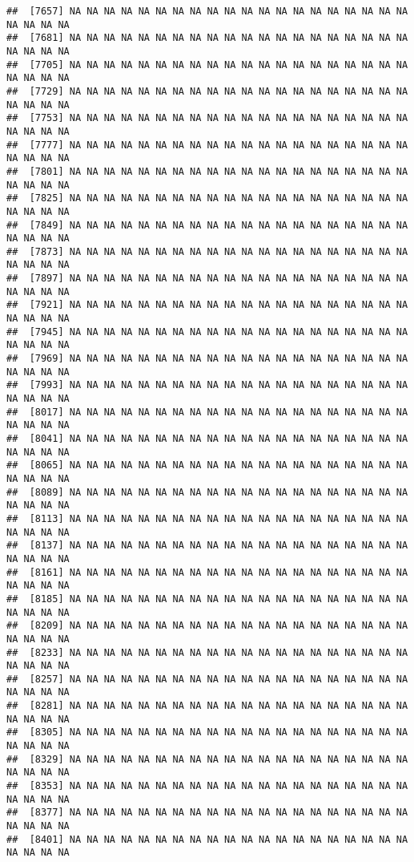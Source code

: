 \documentclass[
]{article}
\begin{document}
\begin{verbatim}
##  [7657] NA NA NA NA NA NA NA NA NA NA NA NA NA NA NA NA NA NA NA NA NA NA NA NA
##  [7681] NA NA NA NA NA NA NA NA NA NA NA NA NA NA NA NA NA NA NA NA NA NA NA NA
##  [7705] NA NA NA NA NA NA NA NA NA NA NA NA NA NA NA NA NA NA NA NA NA NA NA NA
##  [7729] NA NA NA NA NA NA NA NA NA NA NA NA NA NA NA NA NA NA NA NA NA NA NA NA
##  [7753] NA NA NA NA NA NA NA NA NA NA NA NA NA NA NA NA NA NA NA NA NA NA NA NA
##  [7777] NA NA NA NA NA NA NA NA NA NA NA NA NA NA NA NA NA NA NA NA NA NA NA NA
##  [7801] NA NA NA NA NA NA NA NA NA NA NA NA NA NA NA NA NA NA NA NA NA NA NA NA
##  [7825] NA NA NA NA NA NA NA NA NA NA NA NA NA NA NA NA NA NA NA NA NA NA NA NA
##  [7849] NA NA NA NA NA NA NA NA NA NA NA NA NA NA NA NA NA NA NA NA NA NA NA NA
##  [7873] NA NA NA NA NA NA NA NA NA NA NA NA NA NA NA NA NA NA NA NA NA NA NA NA
##  [7897] NA NA NA NA NA NA NA NA NA NA NA NA NA NA NA NA NA NA NA NA NA NA NA NA
##  [7921] NA NA NA NA NA NA NA NA NA NA NA NA NA NA NA NA NA NA NA NA NA NA NA NA
##  [7945] NA NA NA NA NA NA NA NA NA NA NA NA NA NA NA NA NA NA NA NA NA NA NA NA
##  [7969] NA NA NA NA NA NA NA NA NA NA NA NA NA NA NA NA NA NA NA NA NA NA NA NA
##  [7993] NA NA NA NA NA NA NA NA NA NA NA NA NA NA NA NA NA NA NA NA NA NA NA NA
##  [8017] NA NA NA NA NA NA NA NA NA NA NA NA NA NA NA NA NA NA NA NA NA NA NA NA
##  [8041] NA NA NA NA NA NA NA NA NA NA NA NA NA NA NA NA NA NA NA NA NA NA NA NA
##  [8065] NA NA NA NA NA NA NA NA NA NA NA NA NA NA NA NA NA NA NA NA NA NA NA NA
##  [8089] NA NA NA NA NA NA NA NA NA NA NA NA NA NA NA NA NA NA NA NA NA NA NA NA
##  [8113] NA NA NA NA NA NA NA NA NA NA NA NA NA NA NA NA NA NA NA NA NA NA NA NA
##  [8137] NA NA NA NA NA NA NA NA NA NA NA NA NA NA NA NA NA NA NA NA NA NA NA NA
##  [8161] NA NA NA NA NA NA NA NA NA NA NA NA NA NA NA NA NA NA NA NA NA NA NA NA
##  [8185] NA NA NA NA NA NA NA NA NA NA NA NA NA NA NA NA NA NA NA NA NA NA NA NA
##  [8209] NA NA NA NA NA NA NA NA NA NA NA NA NA NA NA NA NA NA NA NA NA NA NA NA
##  [8233] NA NA NA NA NA NA NA NA NA NA NA NA NA NA NA NA NA NA NA NA NA NA NA NA
##  [8257] NA NA NA NA NA NA NA NA NA NA NA NA NA NA NA NA NA NA NA NA NA NA NA NA
##  [8281] NA NA NA NA NA NA NA NA NA NA NA NA NA NA NA NA NA NA NA NA NA NA NA NA
##  [8305] NA NA NA NA NA NA NA NA NA NA NA NA NA NA NA NA NA NA NA NA NA NA NA NA
##  [8329] NA NA NA NA NA NA NA NA NA NA NA NA NA NA NA NA NA NA NA NA NA NA NA NA
##  [8353] NA NA NA NA NA NA NA NA NA NA NA NA NA NA NA NA NA NA NA NA NA NA NA NA
##  [8377] NA NA NA NA NA NA NA NA NA NA NA NA NA NA NA NA NA NA NA NA NA NA NA NA
##  [8401] NA NA NA NA NA NA NA NA NA NA NA NA NA NA NA NA NA NA NA NA NA NA NA NA

\end{verbatim}
\end{document}

